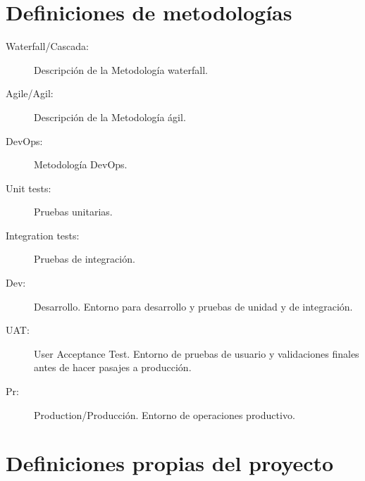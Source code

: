 \section{Definiciones de metodologías}
    
\begin{description}

\item[Waterfall/Cascada:] Descripción de la Metodología waterfall.
\item[Agile/Agil:] Descripción de la Metodología ágil.
\item[DevOps:] Metodología DevOps.
\item[Unit tests:] Pruebas unitarias.
\item[Integration tests:] Pruebas de integración.
\item[Dev:] Desarrollo. Entorno para desarrollo y pruebas de unidad y de integración.
\item[UAT:] User Acceptance Test. Entorno de pruebas de usuario y validaciones finales antes de hacer pasajes a producción.
\item[Pr:] Production/Producción. Entorno de operaciones productivo.

\end{description}

\section{Definiciones propias del proyecto}

